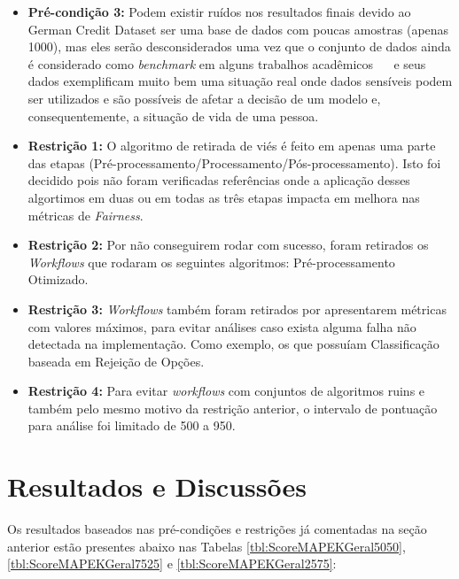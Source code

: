 \documentclass[portugues]{ic-tese}
\begin{document}
\begin{itemize}
\item \textbf{Pré-condição 3:} Podem existir ruídos nos resultados finais devido ao German Credit Dataset ser uma base de dados com poucas amostras (apenas 1000), mas eles serão desconsiderados uma vez que o conjunto de dados ainda é considerado como \textit{benchmark} em alguns trabalhos acadêmicos \citep{Kamiran_2011}~\citep{Feldman_2015}~\citep{Celis_2019} e seus dados exemplificam muito bem uma situação real onde dados sensíveis podem ser utilizados e são possíveis de afetar a decisão de um modelo e, consequentemente, a situação de vida de uma pessoa.

\item \textbf{Restrição 1:} O algoritmo de retirada de viés é feito em apenas uma parte das etapas (Pré-processamento/Processamento/Pós-processamento). Isto foi decidido pois não foram verificadas referências onde a aplicação desses algortimos em duas ou em todas as três etapas impacta em melhora nas métricas de \textit{Fairness}.

\item \textbf{Restrição 2:} Por não conseguirem rodar com sucesso, foram retirados os \textit{Workflows} que rodaram os seguintes algoritmos: Pré-processamento Otimizado.

\item \textbf{Restrição 3:} \textit{Workflows} também foram retirados por apresentarem métricas com valores máximos, para evitar análises caso exista alguma falha não detectada na implementação. Como exemplo, os que possuíam Classificação baseada em Rejeição de Opções.

\item \textbf{Restrição 4:} Para evitar \textit{workflows} com conjuntos de algoritmos ruins e também pelo mesmo motivo da restrição anterior, o intervalo de pontuação para análise foi limitado de 500 a 950.
\end{itemize}

\section{Resultados e Discussões}

Os resultados baseados nas pré-condições e restrições já comentadas na seção anterior estão presentes abaixo nas Tabelas \ref{tbl:ScoreMAPEKGeral5050}, \ref{tbl:ScoreMAPEKGeral7525} e \ref{tbl:ScoreMAPEKGeral2575}:
\end{document}
